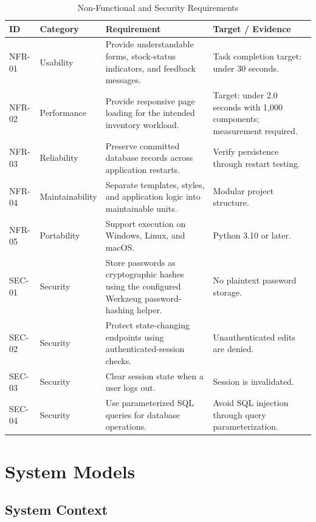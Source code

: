 \documentclass[conference]{IEEEtran}
\begin{document}
\begin{table}[!t]
\caption{Non-Functional and Security Requirements}
\label{tab:nfr}
\centering
\small
\begin{tabularx}{\textwidth}{l l Y Y}
\toprule
\textbf{ID} & \textbf{Category} & \textbf{Requirement} & \textbf{Target / Evidence}\\
\midrule
NFR-01 & Usability & Provide understandable forms, stock-status indicators, and feedback messages. & Task completion target: under 30 seconds.\\
NFR-02 & Performance & Provide responsive page loading for the intended inventory workload. & Target: under 2.0 seconds with 1,000 components; measurement required.\\
NFR-03 & Reliability & Preserve committed database records across application restarts. & Verify persistence through restart testing.\\
NFR-04 & Maintainability & Separate templates, styles, and application logic into maintainable units. & Modular project structure.\\
NFR-05 & Portability & Support execution on Windows, Linux, and macOS. & Python 3.10 or later.\\
SEC-01 & Security & Store passwords as cryptographic hashes using the configured Werkzeug password-hashing helper. & No plaintext password storage.\\
SEC-02 & Security & Protect state-changing endpoints using authenticated-session checks. & Unauthenticated edits are denied.\\
SEC-03 & Security & Clear session state when a user logs out. & Session is invalidated.\\
SEC-04 & Security & Use parameterized SQL queries for database operations. & Avoid SQL injection through query parameterization.\\
\bottomrule
\end{tabularx}
\end{table}

\section{System Models}

\subsection{System Context}
\end{document}
